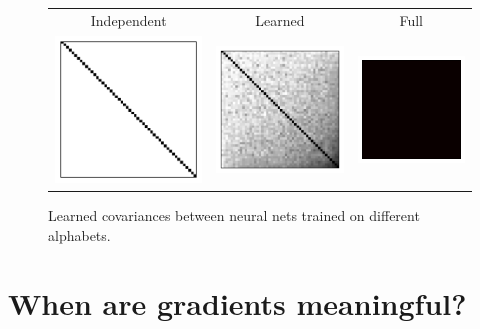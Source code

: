 \documentclass{article}
\begin{document}
\begin{figure}[h!]
\begin{center}
\begin{tabular}{ccc}
Independent & Learned & Full \\
\hspace{-1em}\includegraphics[width=0.31 \columnwidth]{../experiments/Feb_1_learning_alphabet_corr/5/covar_eye.pdf} &
\hspace{-1em}\includegraphics[width=0.31 \columnwidth]{../experiments/Feb_1_learning_alphabet_corr/5/covar_learned_toplayer.pdf} &
\hspace{-1em}\includegraphics[width=0.31 \columnwidth]{../experiments/Feb_1_learning_alphabet_corr/5/covar_full.pdf}
\end{tabular}
\caption{Learned covariances between neural nets trained on different alphabets.}
\label{fig:omniglot}
\end{center}
\end{figure} 



\section{When are gradients meaningful?}
\end{document}
